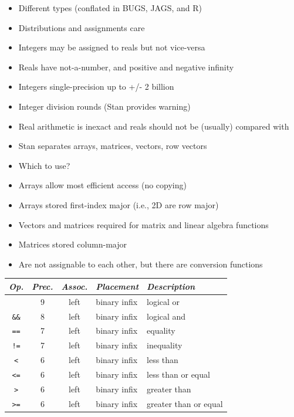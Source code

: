 \documentclass[10pt]{report}
\begin{document}
\begin{itemize}
\item Different types (conflated in BUGS, JAGS, and R)
\item Distributions and assignments care
\item Integers may be assigned to reals but not vice-versa
\item Reals have not-a-number, and positive and negative infinity
\item Integers single-precision up to +/- 2 billion
\item Integer division rounds (Stan provides warning)
\item Real arithmetic is inexact and reals should not be (usually) compared with \code{==}
\end{itemize}

\begin{itemize}
\item Stan separates arrays, matrices, vectors, row vectors
\item Which to use?
\item Arrays allow most efficient access (no copying)
\item Arrays stored first-index major (i.e., 2D are row major)
\item Vectors and matrices required for matrix and linear algebra functions
\item Matrices stored column-major
\item Are not assignable to each other, but there are conversion functions
\end{itemize}

\vfill
\noindent\spc
{\footnotesize
  \begin{tabular}{c|ccl|l}
    {\it Op.} & {\it Prec.} & {\it Assoc.} & {\it
      Placement} & {\it Description}
    \\ \hline \hline
    \code{||} & 9 & left & binary infix & logical or
    \\ \hline
    \Verb|&&| & 8 & left & binary infix & logical and
    \\ \hline
    \Verb|==| & 7 & left & binary infix & equality
    \\
    \Verb|!=| & 7 & left & binary infix & inequality
    \\ \hline
    \Verb|<| & 6 & left & binary infix & less than
    \\
    \Verb|<=| & 6 & left & binary infix & less than or equal
    \\
    \Verb|>| & 6 & left & binary infix & greater than 
    \\
    \Verb|>=| & 6 & left & binary infix & greater than or equal
  \end{tabular}
}
\vfill
\vfill
\end{document}

